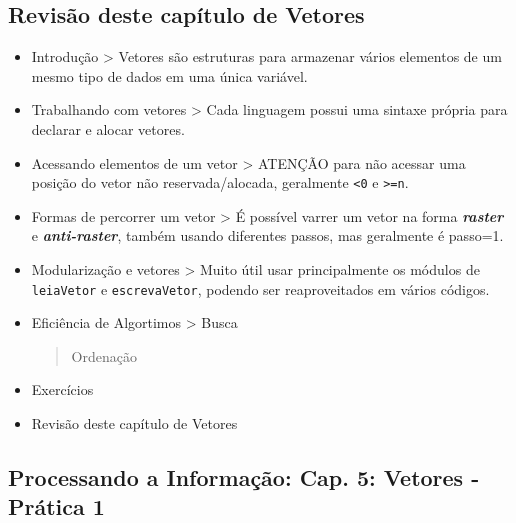 \documentclass[12pt,a4paper]{article}
\begin{document}
    \hypertarget{revisuxe3o-deste-capuxedtulo-de-vetores}{%
\subsection{Revisão deste capítulo de
Vetores}\label{revisuxe3o-deste-capuxedtulo-de-vetores}}

\begin{itemize}
\item
  Introdução \textgreater{} Vetores são estruturas para armazenar vários
  elementos de um mesmo tipo de dados em uma única variável.
\item
  Trabalhando com vetores \textgreater{} Cada linguagem possui uma
  sintaxe própria para declarar e alocar vetores.
\item
  Acessando elementos de um vetor \textgreater{} ATENÇÃO para não
  acessar uma posição do vetor não reservada/alocada, geralmente
  \texttt{\textless{}0} e \texttt{\textgreater{}=n}.
\item
  Formas de percorrer um vetor \textgreater{} É possível varrer um vetor
  na forma \textbf{\emph{raster}} e \textbf{\emph{anti-raster}}, também
  usando diferentes passos, mas geralmente é passo=1.
\item
  Modularização e vetores \textgreater{} Muito útil usar principalmente
  os módulos de \texttt{leiaVetor} e \texttt{escrevaVetor}, podendo ser
  reaproveitados em vários códigos.
\item
  Eficiência de Algortimos \textgreater{} Busca

  \begin{quote}
  Ordenação
  \end{quote}
\item
  Exercícios
\item
  Revisão deste capítulo de Vetores
\end{itemize}

    \hypertarget{processando-a-informauxe7uxe3o-cap.-5-vetores---pruxe1tica-1}{%
\subsection{Processando a Informação: Cap. 5: Vetores - Prática
1}\label{processando-a-informauxe7uxe3o-cap.-5-vetores---pruxe1tica-1}}
\end{document}
